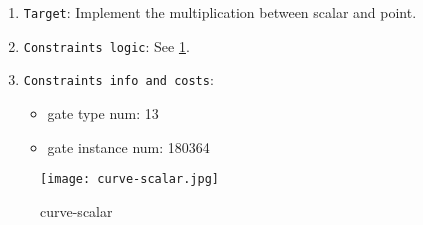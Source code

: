 
\begin{enumerate}
    \item \verb|Target|: Implement the multiplication between scalar and point.
    \item \verb|Constraints logic|: See \ref{fig:curve-scalar}.
    \item \verb|Constraints info and costs|:
    \begin{itemize}
        \item gate type num: 13 
        \item gate instance num: 180364          
    \end{itemize}
\end{enumerate}

\begin{figure}[!ht]
    \centering
    \texttt{[image: curve-scalar.jpg]}
    \caption{curve-scalar}
    \label{fig:curve-scalar}
\end{figure}
